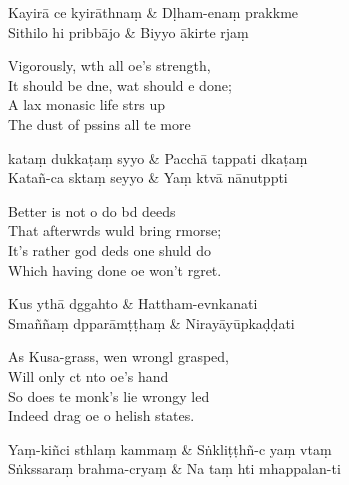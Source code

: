 \begin{twochants}
  Kayirā ce kyirāthnaṃ & Dḷham-enaṃ prakkme \\
  Sithilo hi pribbājo & Biyyo ākirte rjaṃ \\
\end{twochants}

\begin{english}
  Vigorously, wth all oe's strength,\\
  It should be dne, wat should e done;\\
  A lax monasic life strs up\\
  The dust of pssins all te more
\end{english}

\begin{twochants}
  kataṃ dukkaṭaṃ syyo & Pacchā tappati dkaṭaṃ \\
  Katañ-ca sktaṃ seyyo & Yaṃ ktvā nānutppti \\
\end{twochants}

\begin{english}
  Better is not o do bd deeds\\
  That afterwrds wuld bring rmorse;\\
  It's rather god deds one shuld do\\
  Which having done oe won't rgret.
\end{english}

\begin{twochants}
  Kus ythā dggahto & Hattham-evnkanati \\
  Smaññaṃ dpparāmṭṭhaṃ & Nirayāyūpkaḍḍati \\
\end{twochants}

\begin{english}
  As Kusa-grass, wen wrongl grasped,\\
  Will only ct nto oe's hand\\
  So does te monk's lie wrongy led\\
  Indeed drag oe o helish states.
\end{english}

\begin{twochants}
  Yaṃ-kiñci sthlaṃ kammaṃ & Sṅkliṭṭhñ-c yaṃ vtaṃ \\
  Sṅkssaraṃ brahma-cryaṃ & Na taṃ hti mhappalan-ti \\
\end{twochants}

